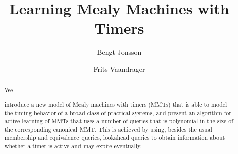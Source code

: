 \documentclass{llncs}
\newif\iflong
\newif\ifshort
\begin{document}
\title{Learning Mealy Machines with Timers}
\author{
Bengt Jonsson 
\and
Frits Vaandrager 
}

\maketitle

\ifshort
\vspace{-2em}
\fi
\begin{abstract}
\iflong
Active automata learning is emerging as an effective bug finding technique, with applications in areas such as banking cards, network protocols and legacy software. Timing often plays a crucial role in these applications, but cannot be handled by existing learning algorithms. Even though there has been significant progress on algorithms for active learning of timed models, these are not yet broadly applicable due to limited expressiveness and/or high complexity.
In order to address this problem, we 
\else
We
\fi
introduce a new model of Mealy machines with timers (MMTs) that is able to model the timing behavior of a broad class of practical systems, and present an algorithm for active learning of MMTs that uses a
number of queries that is polynomial in the size of the corresponding canonical MMT. This is achieved by using, besides the usual membership and equivalence queries, 
lookahead queries to obtain information about whether a timer is active and may expire eventually.
\end{abstract}









\end{document}
